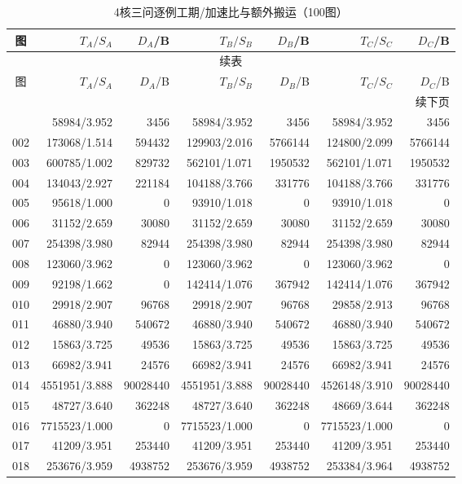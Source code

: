 \begin{longtable}{crrrrrr}
\caption{4核三问逐例工期/加速比与额外搬运（100图）}\label{tab:detail-4}\\
\toprule
图 & $T_A/S_A$ & $D_A$/B & $T_B/S_B$ & $D_B$/B & $T_C/S_C$ & $D_C$/B \\
\midrule
\endfirsthead
\multicolumn{7}{c}{续表}\\
\toprule
图 & $T_A/S_A$ & $D_A$/B & $T_B/S_B$ & $D_B$/B & $T_C/S_C$ & $D_C$/B \\
\midrule
\endhead
\midrule\multicolumn{7}{r}{续下页}\\
\endfoot
\bottomrule
\endlastfoot
001 & 58984/3.952 & 3456 & 58984/3.952 & 3456 & 58984/3.952 & 3456 \\
002 & 173068/1.514 & 594432 & 129903/2.016 & 5766144 & 124800/2.099 & 5766144 \\
003 & 600785/1.002 & 829732 & 562101/1.071 & 1950532 & 562101/1.071 & 1950532 \\
004 & 134043/2.927 & 221184 & 104188/3.766 & 331776 & 104188/3.766 & 331776 \\
005 & 95618/1.000 & 0 & 93910/1.018 & 0 & 93910/1.018 & 0 \\
006 & 31152/2.659 & 30080 & 31152/2.659 & 30080 & 31152/2.659 & 30080 \\
007 & 254398/3.980 & 82944 & 254398/3.980 & 82944 & 254398/3.980 & 82944 \\
008 & 123060/3.962 & 0 & 123060/3.962 & 0 & 123060/3.962 & 0 \\
009 & 92198/1.662 & 0 & 142414/1.076 & 367942 & 142414/1.076 & 367942 \\
010 & 29918/2.907 & 96768 & 29918/2.907 & 96768 & 29858/2.913 & 96768 \\
011 & 46880/3.940 & 540672 & 46880/3.940 & 540672 & 46880/3.940 & 540672 \\
012 & 15863/3.725 & 49536 & 15863/3.725 & 49536 & 15863/3.725 & 49536 \\
013 & 66982/3.941 & 24576 & 66982/3.941 & 24576 & 66982/3.941 & 24576 \\
014 & 4551951/3.888 & 90028440 & 4551951/3.888 & 90028440 & 4526148/3.910 & 90028440 \\
015 & 48727/3.640 & 362248 & 48727/3.640 & 362248 & 48669/3.644 & 362248 \\
016 & 7715523/1.000 & 0 & 7715523/1.000 & 0 & 7715523/1.000 & 0 \\
017 & 41209/3.951 & 253440 & 41209/3.951 & 253440 & 41209/3.951 & 253440 \\
018 & 253676/3.959 & 4938752 & 253676/3.959 & 4938752 & 253384/3.964 & 4938752 \\

\end{longtable}
